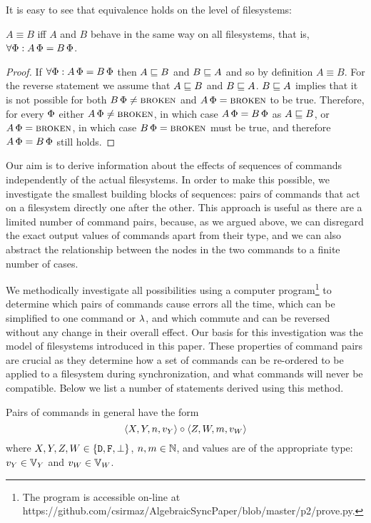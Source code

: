 It is easy to see that equivalence holds on the level of filesystems:

\begin{mylem}
$A\equiv B$
iff $A$ and $B$ behave in the same way on
all filesystems, that is, $\forall \Phi: A\,\Phi=B\,\Phi$.
\end{mylem}
\begin{proof}
If $\forall \Phi: A\,\Phi=B\,\Phi$ then $A\sqsubseteq B$ and $B\sqsubseteq A$ and so by definition $A\equiv B$.
For the reverse statement we assume that $A\sqsubseteq B$ and $B\sqsubseteq A$.
$B\sqsubseteq A$ implies that it is not possible for both $B\,\Phi\neq\text{\normalfont\scshape{broken}}$ and $A\,\Phi=\text{\normalfont\scshape{broken}}$ to be true.
Therefore, for every $\Phi$ either $A\,\Phi\neq\text{\normalfont\scshape{broken}}$, in which case $A\,\Phi=B\,\Phi$ as $A\sqsubseteq B$, or $A\,\Phi=\text{\normalfont\scshape{broken}}$,
in which case $B\,\Phi=\text{\normalfont\scshape{broken}}$ must be true, and therefore $A\,\Phi=B\,\Phi$ still holds.
\end{proof}


Our aim is to derive information about the effects of sequences
of commands independently of the actual filesystems.
In order to make this possible, we investigate the smallest building
blocks of sequences: pairs of commands that act on a filesystem directly one after the other.
This approach is useful as there are a limited number of command pairs,
because, as we argued above, we can disregard the exact output values of commands apart from their type,
and we can also abstract the relationship between the nodes in the two commands
to a finite number of cases.

We methodically investigate all possibilities using a computer 
program\footnote{The program is accessible on-line at \\
https://github.com/csirmaz/AlgebraicSyncPaper/blob/master/p2/prove.py.}
to determine
which pairs of commands cause errors all the time,
which can be simplified to one command or $\lambda$,
and which commute and can be reversed without any change in their overall effect.
Our basis for this investigation was the model of filesystems introduced in this paper.
These properties of command pairs are crucial as they determine
how a set of commands can be re-ordered to be applied to a filesystem
during synchronization, and what commands will never be compatible.
Below we list a number of statements derived using this method.

\bigskip

\noindent
Pairs of commands in general have the form
\[ \langle{X,Y,n,v_Y}\rangle\circ  \langle{Z,W,m,v_W}\rangle \]
where $X,Y,Z,W\in\{\mathtt{D},\mathtt{F},\bot\}$, $n,m\in\mathbb{N}$, 
and values are of the appropriate type: 
$v_Y\in\mathbb{V}_{Y}$ and $v_W\in\mathbb{V}_{W}$.

